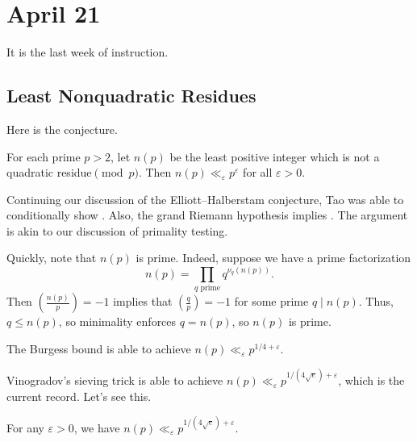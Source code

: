\documentclass[../notes.tex]{subfiles}
\begin{document}
\section{April 21}

It is the last week of instruction.

\subsection{Least Nonquadratic Residues}
Here is the conjecture.
\begin{conj}[Vinogradov] \label{conj:vinogradov}
	For each prime $p>2$, let $n(p)$ be the least positive integer which is not a quadratic residue$\pmod p$. Then $n(p)\ll_\varepsilon p^\varepsilon$ for all $\varepsilon>0$.
\end{conj}
\begin{remark}
	Continuing our discussion of the Elliott--Halberstam conjecture, Tao was able to conditionally show . Also, the grand Riemann hypothesis implies . The argument is akin to our discussion of primality testing.
\end{remark}
\begin{remark}
	Quickly, note that $n(p)$ is prime. Indeed, suppose we have a prime factorization
	\[n(p)=\prod_{q\text{ prime}}q^{\nu_q(n(p))}.\]
	Then $\left(\frac{n(p)}p\right)=-1$ implies that $\left(\frac qp\right)=-1$ for some prime $q\mid n(p)$. Thus, $q\le n(p)$, so minimality enforces $q=n(p)$, so $n(p)$ is prime.
\end{remark}
\begin{remark}
	The Burgess bound is able to achieve $n(p)\ll_\varepsilon p^{1/4+\varepsilon}$.
\end{remark}
Vinogradov's sieving trick is able to achieve $n(p)\ll_\varepsilon p^{1/(4\sqrt e)+\varepsilon}$, which is the current record. Let's see this.
\begin{theorem}
	For any $\varepsilon>0$, we have $n(p)\ll_\varepsilon p^{1/(4\sqrt e)+\varepsilon}$.
\end{theorem}
\end{document}
